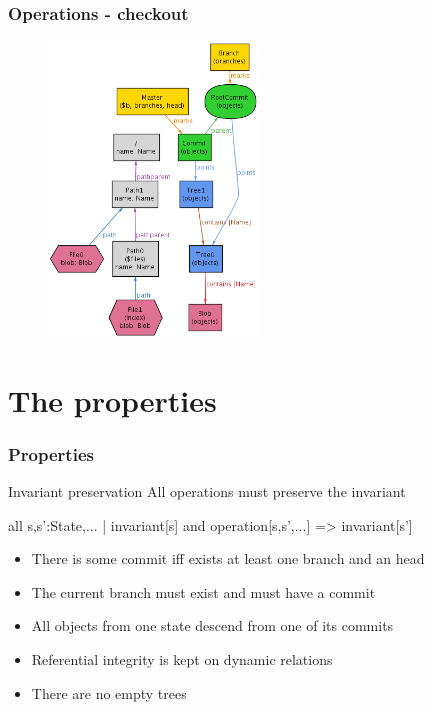 \documentclass{beamer}
\begin{document}
\begin{frame}[fragile]
   \frametitle{Operations - checkout}
      \begin{figure}
         \centering
         \includegraphics[width=0.50\textwidth]{images/checkout2.png}
      \end{figure}
\end{frame}

\section{The properties}
\begin{frame}[fragile]
   \frametitle{Properties}
   \begin{block}{Invariant preservation}
      All operations must preserve the invariant
   \end{block}
   \vspace{0.1in}
all s,s':State,... | invariant[s] and operation[s,s',...] => invariant[s'] \\
   \vspace{0.3in}
   \begin{itemize}
      \item There is some commit iff exists at least one branch and
      an head
      \item The current branch must exist and must have a commit
      \item All objects from one state descend from one of its commits
      \item Referential integrity is kept on dynamic relations
      \item There are no empty trees
   \end{itemize}

\end{frame}
\end{document}
